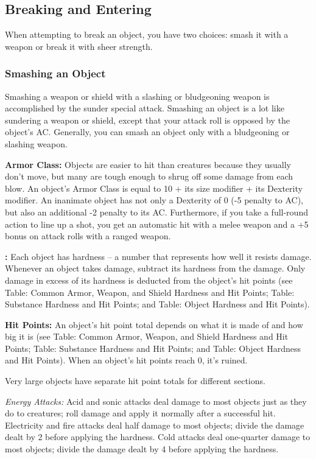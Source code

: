 \subsection{Breaking and Entering}

When attempting to break an object, you have two choices: smash it with a weapon or break it with sheer strength.

\subsubsection{Smashing an Object}

Smashing a weapon or shield with a slashing or bludgeoning weapon is accomplished by the sunder special attack. Smashing an object is a lot like sundering a weapon or shield, except that your attack roll is opposed by the object's AC. Generally, you can smash an object only with a bludgeoning or slashing weapon.

\textbf{Armor Class:} Objects are easier to hit than creatures because they usually don't move, but many are tough enough to shrug off some damage from each blow. An object's Armor Class is equal to 10 + its size modifier + its Dexterity modifier. An inanimate object has not only a Dexterity of 0 (-5 penalty to AC), but also an additional -2 penalty to its AC. Furthermore, if you take a full-round action to line up a shot, you get an automatic hit with a melee weapon and a +5 bonus on attack rolls with a ranged weapon.

\textbf{:} Each object has hardness -- a number that represents how well it resists damage. Whenever an object takes damage, subtract its hardness from the damage. Only damage in excess of its hardness is deducted from the object's hit points (see Table: Common Armor, Weapon, and Shield Hardness and Hit Points; Table: Substance Hardness and Hit Points; and Table: Object Hardness and Hit Points).

\textbf{Hit Points:} An object's hit point total depends on what it is made of and how big it is (see Table: Common Armor, Weapon, and Shield Hardness and Hit Points; Table: Substance Hardness and Hit Points; and Table: Object Hardness and Hit Points). When an object's hit points reach 0, it's ruined.

Very large objects have separate hit point totals for different sections.

\textit{Energy Attacks:} Acid and sonic attacks deal damage to most objects just as they do to creatures; roll damage and apply it normally after a successful hit. Electricity and fire attacks deal half damage to most objects; divide the damage dealt by 2 before applying the hardness. Cold attacks deal one-quarter damage to most objects; divide the damage dealt by 4 before applying the hardness.

